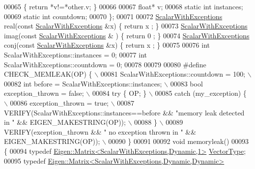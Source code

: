 \begin{DoxyCode}
00065 \textcolor{keyword}{    }\{ \textcolor{keywordflow}{return} *v!=*other.v; \}
00066     
00067     \textcolor{keywordtype}{float}* v;
00068     \textcolor{keyword}{static} \textcolor{keywordtype}{int} instances;
00069     \textcolor{keyword}{static} \textcolor{keywordtype}{int} countdown;
00070 \};
00071 
00072 \hyperlink{class_scalar_with_exceptions}{ScalarWithExceptions} real(\textcolor{keyword}{const} \hyperlink{class_scalar_with_exceptions}{ScalarWithExceptions} &x) \{ \textcolor{keywordflow}{return} x
      ; \}
00073 \hyperlink{class_scalar_with_exceptions}{ScalarWithExceptions} imag(\textcolor{keyword}{const} \hyperlink{class_scalar_with_exceptions}{ScalarWithExceptions} & ) \{ \textcolor{keywordflow}{return} 0
      ; \}
00074 \hyperlink{class_scalar_with_exceptions}{ScalarWithExceptions} conj(\textcolor{keyword}{const} \hyperlink{class_scalar_with_exceptions}{ScalarWithExceptions} &x) \{ \textcolor{keywordflow}{return} x
      ; \}
00075 
00076 \textcolor{keywordtype}{int} ScalarWithExceptions::instances = 0;
00077 \textcolor{keywordtype}{int} ScalarWithExceptions::countdown = 0;
00078 
00079 
00080 \textcolor{preprocessor}{#define CHECK\_MEMLEAK(OP) \{                                 \(\backslash\)}
00081 \textcolor{preprocessor}{    ScalarWithExceptions::countdown = 100;                  \(\backslash\)}
00082 \textcolor{preprocessor}{    int before = ScalarWithExceptions::instances;           \(\backslash\)}
00083 \textcolor{preprocessor}{    bool exception\_thrown = false;                         \(\backslash\)}
00084 \textcolor{preprocessor}{    try \{ OP; \}                              \(\backslash\)}
00085 \textcolor{preprocessor}{    catch (my\_exception) \{                                  \(\backslash\)}
00086 \textcolor{preprocessor}{      exception\_thrown = true;                              \(\backslash\)}
00087 \textcolor{preprocessor}{      VERIFY(ScalarWithExceptions::instances==before && "memory leak detected in " &&
       EIGEN\_MAKESTRING(OP)); \(\backslash\)}
00088 \textcolor{preprocessor}{    \} \(\backslash\)}
00089 \textcolor{preprocessor}{    VERIFY(exception\_thrown && " no exception thrown in " && EIGEN\_MAKESTRING(OP)); \(\backslash\)}
00090 \textcolor{preprocessor}{  \}}
00091 
00092 \textcolor{keywordtype}{void} memoryleak()
00093 \{
00094   \textcolor{keyword}{typedef} \hyperlink{group___core___module_class_eigen_1_1_matrix}{Eigen::Matrix<ScalarWithExceptions,Dynamic,1>} 
      \hyperlink{struct_vector_type}{VectorType};
00095   \textcolor{keyword}{typedef} \hyperlink{group___core___module_class_eigen_1_1_matrix}{Eigen::Matrix<ScalarWithExceptions,Dynamic,Dynamic>}

\end{DoxyCode}
